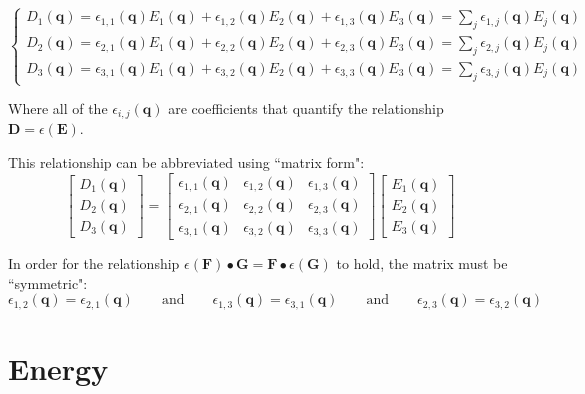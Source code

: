 \[\left\{\begin{array}{c} 
D_1(\mathbf{q}) = \epsilon_{1,1}(\mathbf{q})E_1(\mathbf{q}) + \epsilon_{1,2}(\mathbf{q})E_2(\mathbf{q}) + \epsilon_{1,3}(\mathbf{q})E_3(\mathbf{q}) = \sum_j \epsilon_{1,j}(\mathbf{q})E_j(\mathbf{q}) \\ 
D_2(\mathbf{q}) = \epsilon_{2,1}(\mathbf{q})E_1(\mathbf{q}) + \epsilon_{2,2}(\mathbf{q})E_2(\mathbf{q}) + \epsilon_{2,3}(\mathbf{q})E_3(\mathbf{q}) = \sum_j \epsilon_{2,j}(\mathbf{q})E_j(\mathbf{q}) \\ 
D_3(\mathbf{q}) = \epsilon_{3,1}(\mathbf{q})E_1(\mathbf{q}) + \epsilon_{3,2}(\mathbf{q})E_2(\mathbf{q}) + \epsilon_{3,3}(\mathbf{q})E_3(\mathbf{q}) = \sum_j \epsilon_{3,j}(\mathbf{q})E_j(\mathbf{q}) 
\end{array}\right.\]

Where all of the \(\epsilon_{i,j}(\mathbf{q})\) are coefficients that quantify the relationship \(\mathbf{D} = \epsilon(\mathbf{E})\).

This relationship can be abbreviated using ``matrix form": 
\[\begin{bmatrix} D_1(\mathbf{q}) \\ D_2(\mathbf{q}) \\ D_3(\mathbf{q}) \end{bmatrix} 
= \begin{bmatrix}
\epsilon_{1,1}(\mathbf{q}) & \epsilon_{1,2}(\mathbf{q}) & \epsilon_{1,3}(\mathbf{q}) \\ 
\epsilon_{2,1}(\mathbf{q}) & \epsilon_{2,2}(\mathbf{q}) & \epsilon_{2,3}(\mathbf{q}) \\ 
\epsilon_{3,1}(\mathbf{q}) & \epsilon_{3,2}(\mathbf{q}) & \epsilon_{3,3}(\mathbf{q}) 
\end{bmatrix}
\begin{bmatrix} E_1(\mathbf{q}) \\ E_2(\mathbf{q}) \\ E_3(\mathbf{q}) \end{bmatrix}\]  

In order for the relationship \(\epsilon(\mathbf{F}) \bullet \mathbf{G} = \mathbf{F} \bullet \epsilon(\mathbf{G})\) to hold, the matrix must be ``symmetric":
\[\epsilon_{1,2}(\mathbf{q}) = \epsilon_{2,1}(\mathbf{q}) \quad\quad\text{and}\quad\quad 
\epsilon_{1,3}(\mathbf{q}) = \epsilon_{3,1}(\mathbf{q}) \quad\quad\text{and}\quad\quad 
\epsilon_{2,3}(\mathbf{q}) = \epsilon_{3,2}(\mathbf{q})\] 



\section{Energy}

